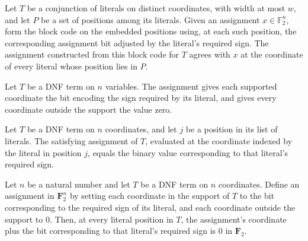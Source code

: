 \begin{theorem}
\label{FABL.DNFTerm.assignmentForTerm_blockCode_literal}
\leanok
{}
Let $T$ be a conjunction of literals on distinct coordinates, with width at most $w$,
and let $P$ be a set of positions among its literals. Given an assignment
$x\in\mathbb{F}_2^n$, form the block code on the embedded positions using, at each such
position, the corresponding assignment bit adjusted by the literal's required sign. The
assignment constructed from this block code for $T$ agrees with $x$ at the coordinate of
every literal whose position lies in $P$.
\end{theorem}

\begin{definition}
\label{FABL.DNFTerm.satisfyingAssignment}
\leanok
{}
Let $T$ be a DNF term on $n$ variables. The assignment gives each supported coordinate
the bit encoding the sign required by its literal, and gives every coordinate outside
the support the value zero.
\end{definition}

\begin{theorem}
\label{FABL.DNFTerm.satisfyingAssignment_literal}
\leanok
{}
Let $T$ be a DNF term on $n$ coordinates, and let $j$ be a position in its list of
literals. The satisfying assignment of $T$, evaluated at the coordinate indexed by the
literal in position $j$, equals the binary value corresponding to that literal's
required sign.
\end{theorem}

\begin{theorem}
\label{FABL.DNFTerm.relativeBit_satisfyingAssignment}
\leanok
{}
Let $n$ be a natural number and let $T$ be a DNF term on $n$ coordinates. Define an
assignment in $\boldsymbol{F}_2^n$ by setting each coordinate in the support of $T$ to
the bit corresponding to the required sign of its literal, and each coordinate outside
the support to $0$. Then, at every literal position in $T$, the assignment's coordinate
plus the bit corresponding to that literal's required sign is $0$ in $\boldsymbol{F}_2$.
\end{theorem}

